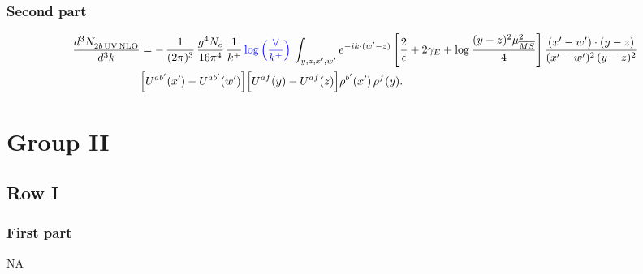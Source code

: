 \documentclass[9pt]{article}
\numberwithin{equation}{section}
\begin{document}
\subsubsection*{Second part}
\begin{align}
\frac{d^{3}N_{2b\,\rm UV\, NLO}^{\rm}}{d^{3}k} & = -\,\frac{1}{(2\pi)^{3}}\,\frac{g^{4}N_{c}}{16\pi^{4}}\,\frac{1}{k^{+}}
\,{\color{blue} \log{\left(\frac{\vee}{k^{+}}\right)}}\,\int_{y,z,x',w'}e^{-ik\cdot(w'-z)}\left[\frac{2}{\epsilon}+2\gamma_{E}+\log\frac{(y-z)^{2}\mu^{2}_{\overline{MS}}}{4}\right]
\frac{(x'-w')\cdot(y-z)}{(x'-w')^{2}\,(y-z)^{2}}\notag \\ &  \Big[U^{ab'}(x')-U^{ab'}(w')\Big]\Big[U^{af}(y)-U^{af}(z)\Big]\rho^{b'}(x')\,\rho^{f}(y).
\end{align}
\section{Group II}
\subsection{Row I}
\subsubsection{First part}
\textsc{NA}
\end{document}
